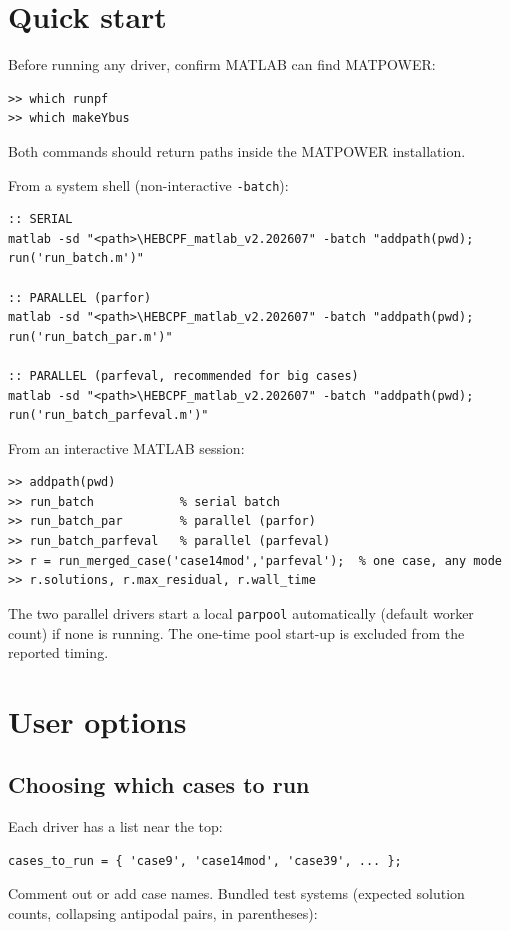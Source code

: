 \documentclass[11pt,a4paper]{article}
\newcommand{\code}[1]{\texttt{#1}}
\begin{document}
\section{Quick start}

Before running any driver, confirm MATLAB can find MATPOWER:
\begin{lstlisting}[style=mat]
>> which runpf
>> which makeYbus
\end{lstlisting}
Both commands should return paths inside the MATPOWER installation.

From a system shell (non-interactive \code{-batch}):
\begin{lstlisting}[style=sh]
:: SERIAL
matlab -sd "<path>\HEBCPF_matlab_v2.202607" -batch "addpath(pwd); run('run_batch.m')"

:: PARALLEL (parfor)
matlab -sd "<path>\HEBCPF_matlab_v2.202607" -batch "addpath(pwd); run('run_batch_par.m')"

:: PARALLEL (parfeval, recommended for big cases)
matlab -sd "<path>\HEBCPF_matlab_v2.202607" -batch "addpath(pwd); run('run_batch_parfeval.m')"
\end{lstlisting}

From an interactive MATLAB session:
\begin{lstlisting}[style=mat]
>> addpath(pwd)
>> run_batch            % serial batch
>> run_batch_par        % parallel (parfor)
>> run_batch_parfeval   % parallel (parfeval)
>> r = run_merged_case('case14mod','parfeval');  % one case, any mode
>> r.solutions, r.max_residual, r.wall_time
\end{lstlisting}

The two parallel drivers start a local \code{parpool} automatically (default worker
count) if none is running. The one-time pool start-up is excluded from the reported
timing.

\section{User options}

\subsection{Choosing which cases to run}
Each driver has a list near the top:
\begin{lstlisting}[style=mat]
cases_to_run = { 'case9', 'case14mod', 'case39', ... };
\end{lstlisting}
Comment out or add case names. Bundled test systems (expected solution counts, collapsing
antipodal pairs, in parentheses):
\end{document}
